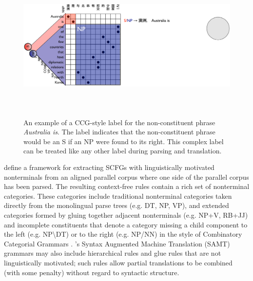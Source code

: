 \begin{figure}
\begin{center}
\includegraphics[height=3in]{SCFGs/scfg-ccg-phrase-extraction.pdf}
\end{center}
\caption{An example of a CCG-style label for the non-constituent phrase {\it Australia is}.  The label indicates that the non-constituent phrase would be an S if an NP were found to its right.  This complex label can be treated like any other label during parsing and translation. }\label{scfg-ccg-phrase-extraction}
\end{figure}


\citet{samt} define a framework for extracting SCFGs with linguistically motivated nonterminals from an aligned parallel corpus where one side of the parallel corpus has been parsed. The resulting context-free rules contain a rich set of nonterminal categories. These categories include traditional nonterminal categories taken directly from the monolingual parse trees (e.g. DT, NP, VP), and extended categories formed by gluing together adjacent nonterminals (e.g. NP+V, RB+JJ) and incomplete constituents that denote a category missing a child component to the left (e.g.  NP\textbackslash DT) or to the right (e.g. NP/NN) in the style of Combinatory Categorial Grammars \cite{ccg1982}.   \citet{samt}'s Syntax Augmented Machine Translation (SAMT) grammars may also include hierarchical rules and glue rules \cite{chiang:2007} that are not linguistically motivated; such rules allow partial translations to be combined (with some penalty) without regard to syntactic structure.



